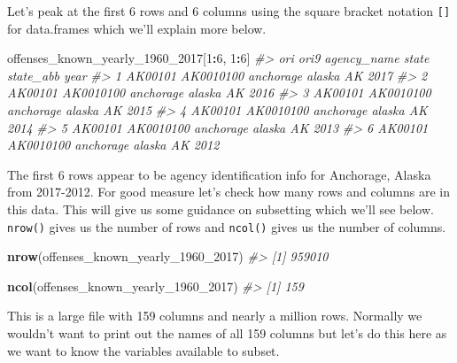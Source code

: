 \documentclass[
  12pt,
]{book}
\newenvironment{Shaded}{\begin{snugshade}}{\end{snugshade}}
\newcommand{\CommentTok}[1]{\textcolor[rgb]{0.37,0.37,0.37}{\textit{#1}}}
\newcommand{\DecValTok}[1]{\textcolor[rgb]{0.06,0.06,0.06}{#1}}
\newcommand{\KeywordTok}[1]{\textcolor[rgb]{0.27,0.27,0.27}{\textbf{#1}}}
\newcommand{\NormalTok}[1]{#1}
\newcommand{\OperatorTok}[1]{\textcolor[rgb]{0.43,0.43,0.43}{\textbf{#1}}}
\begin{document}
Let's peak at the first 6 rows and 6 columns using the square bracket notation \texttt{{[}{]}} for data.frames which we'll explain more below.

\begin{Shaded}
\begin{Highlighting}[]
\NormalTok{offenses\_known\_yearly\_}\DecValTok{1960}\NormalTok{\_}\DecValTok{2017}\NormalTok{[}\DecValTok{1}\OperatorTok{:}\DecValTok{6}\NormalTok{, }\DecValTok{1}\OperatorTok{:}\DecValTok{6}\NormalTok{]}
\CommentTok{\#>       ori      ori9 agency\_name  state state\_abb year}
\CommentTok{\#> 1 AK00101 AK0010100   anchorage alaska        AK 2017}
\CommentTok{\#> 2 AK00101 AK0010100   anchorage alaska        AK 2016}
\CommentTok{\#> 3 AK00101 AK0010100   anchorage alaska        AK 2015}
\CommentTok{\#> 4 AK00101 AK0010100   anchorage alaska        AK 2014}
\CommentTok{\#> 5 AK00101 AK0010100   anchorage alaska        AK 2013}
\CommentTok{\#> 6 AK00101 AK0010100   anchorage alaska        AK 2012}
\end{Highlighting}
\end{Shaded}

The first 6 rows appear to be agency identification info for Anchorage, Alaska from 2017-2012. For good measure let's check how many rows and columns are in this data. This will give us some guidance on subsetting which we'll see below. \texttt{nrow()} gives us the number of rows and \texttt{ncol()} gives us the number of columns.

\begin{Shaded}
\begin{Highlighting}[]
\KeywordTok{nrow}\NormalTok{(offenses\_known\_yearly\_}\DecValTok{1960}\NormalTok{\_}\DecValTok{2017}\NormalTok{)}
\CommentTok{\#> [1] 959010}
\end{Highlighting}
\end{Shaded}

\begin{Shaded}
\begin{Highlighting}[]
\KeywordTok{ncol}\NormalTok{(offenses\_known\_yearly\_}\DecValTok{1960}\NormalTok{\_}\DecValTok{2017}\NormalTok{)}
\CommentTok{\#> [1] 159}
\end{Highlighting}
\end{Shaded}

This is a large file with 159 columns and nearly a million rows. Normally we wouldn't want to print out the names of all 159 columns but let's do this here as we want to know the variables available to subset.
\end{document}
